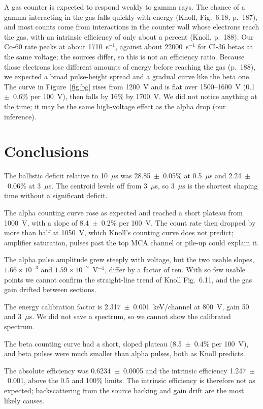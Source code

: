 \documentclass[12pt]{article}
\begin{document}
A gas counter is expected to respond weakly to gamma rays. The chance of a gamma interacting in the gas falls quickly with energy (Knoll, Fig.~6.18, p.~187), and most counts come from interactions in the counter wall whose electrons reach the gas, with an intrinsic efficiency of only about a percent (Knoll, p.~188). Our Co-60 rate peaks at about 1710~s$^{-1}$, against about 22000~s$^{-1}$ for Cl-36 betas at the same voltage; the sources differ, so this is not an efficiency ratio. Because those electrons lose different amounts of energy before reaching the gas (p.~188), we expected a broad pulse-height spread and a gradual curve like the beta one. The curve in Figure~\ref{fig:bg} rises from 1200~V and is flat over 1500--1600~V (0.1~$\pm$~0.6\% per 100~V), then falls by 16\% by 1700~V. We did not notice anything at the time; it may be the same high-voltage effect as the alpha drop (our inference).


\section{Conclusions}
\label{sec:conclusions}

The ballistic deficit relative to 10~$\mu$s was 28.85~$\pm$~0.05\% at 0.5~$\mu$s and 2.24~$\pm$~0.06\% at 3~$\mu$s. The centroid levels off from 3~$\mu$s, so 3~$\mu$s is the shortest shaping time without a significant deficit.

The alpha counting curve rose as expected and reached a short plateau from 1000~V, with a slope of 8.4~$\pm$~0.2\% per 100~V. The count rate then dropped by more than half at 1050~V, which Knoll's counting curve does not predict; amplifier saturation, pulses past the top MCA channel or pile-up could explain it.

The alpha pulse amplitude grew steeply with voltage, but the two usable slopes, $1.66\times10^{-3}$ and $1.59\times10^{-2}$~V$^{-1}$, differ by a factor of ten. With so few usable points we cannot confirm the straight-line trend of Knoll Fig.~6.11, and the gas gain drifted between sections.

The energy calibration factor is 2.317~$\pm$~0.001~keV/channel at 800~V, gain 50 and 3~$\mu$s. We did not save a spectrum, so we cannot show the calibrated spectrum.

The beta counting curve had a short, sloped plateau (8.5~$\pm$~0.4\% per 100~V), and beta pulses were much smaller than alpha pulses, both as Knoll predicts.

The absolute efficiency was 0.6234~$\pm$~0.0005 and the intrinsic efficiency 1.247~$\pm$~0.001, above the 0.5 and 100\% limits. The intrinsic efficiency is therefore not as expected; backscattering from the source backing and gain drift are the most likely causes.
\end{document}
